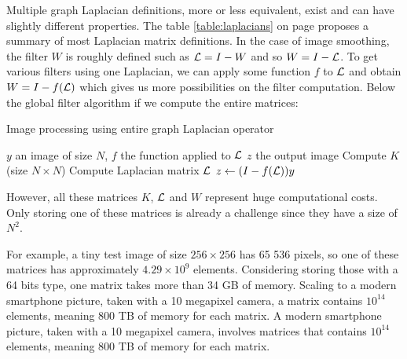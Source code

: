 Multiple graph Laplacian definitions, more or less equivalent, exist and can have slightly different properties.
\ifthesis
The table \ref{table:laplacians} on page \pageref{table:laplacians} proposes a summary of most Laplacian matrix definitions.
\fi
In the case of image smoothing, the filter \(W\) is roughly defined such as \(\operatorname{\mathcal{L}} = I - W\) \cite{siam_slides_2016} and so \(W = I - \operatorname{\mathcal{L}}\).
To get various filters using one Laplacian, we can apply some function \(f\) to \(\operatorname{\mathcal{L}}\) and obtain \(W = I - f(\operatorname{\mathcal{L}})\) which gives us more possibilities on the filter computation.
\ifthesis
 Below the global filter algorithm if we compute the entire matrices:

 \begin{algorithm}[H]
  \caption{Image processing using entire graph Laplacian operator}
  \begin{algorithmic}
   \REQUIRE \(y\) an image of size \(N\), \(f\) the function applied to \(\operatorname{\mathcal{L}}\)
   \ENSURE \(z\) the output image
   \STATE Compute \(K\) (size \(N \times N\))
   \STATE Compute Laplacian matrix \(\operatorname{\mathcal{L}}\)
   \STATE \(z \leftarrow (I - f(\operatorname{\mathcal{L}})) y\)
  \end{algorithmic}
 \end{algorithm}
\fi

However, all these matrices \(K\), \(\operatorname{\mathcal{L}}\) and \(W\) represent huge computational costs.
Only storing one of these matrices is already a challenge since they have a size of \(N^2\).

\ifthesis
 For example, a tiny test image of size \(256 \times 256\) has 65 536 pixels, so one of these matrices has approximately \(4.29 \times 10^9\) elements.
 Considering storing those with a 64 bits type, one matrix takes more than 34 GB of memory.
 Scaling to a modern smartphone picture, taken with a 10 megapixel camera, a matrix contains \(10^{14}\) elements, meaning 800 TB of memory for each matrix.
\else
 A modern smartphone picture, taken with a 10 megapixel camera, involves matrices that contains \(10^{14}\) elements, meaning 800 TB of memory for each matrix.
\fi
